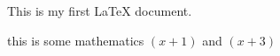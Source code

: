 \documentclass[11pt]{article}
\begin{document}
This is my first LaTeX document.

this is some mathematics $(x+1)$ and $(x+3)$
\end{document}

